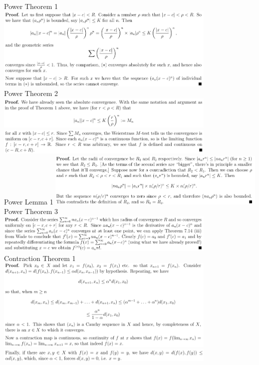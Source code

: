 \documentclass[3pt,landscape]{article}
\begin{document}
\begin{multicols}{2}
    Power Theorem 1
    \includegraphics[width=400]{P_t1.png} \\
    Power Theorem 2
    \includegraphics[width=400]{P_t2a.png} \\
    \includegraphics[width=400]{P_t2b.png} \\
    Power Lemma 1
    \includegraphics[width=400]{P_l1.png} \\
    Power Theorem 3
    \includegraphics[width=400]{P_t3.png} \\

    Contraction Theorem 1
    \includegraphics[width=400]{B_t1a.png} \\
    \includegraphics[width=400]{B_t1b.png} \\

\end{multicols}
\end{document}

